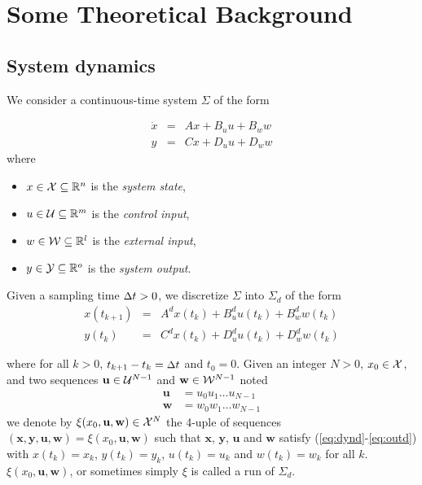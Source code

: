 \documentclass[hyperref, xcolor=dvipsnames, 10pt]{article} %
\def \x {\mathbf{x}}
\def \u {\mathbf{u}}
\def \w {\mathbf{w}}
\def \y {\mathbf{y}}
\def\dt{ \text{\small $\Delta$}t}
\def\X {{\cal X}}
\def\U {{\cal U}}
\def\W {{\cal W}}
\def\Y {{\cal Y}}
\def\Reals {\mathbb{R}}
\begin{document}
\section{Some Theoretical Background} 

\subsection{System dynamics}
We consider a continuous-time system $\Sigma$ of the form 

\begin{eqnarray}
\dot{x} &= &A x + B_u u + B_w w \\ 
 y &=& C x + D_u u + D_w w
\end{eqnarray}
where 
\begin{itemize}
\item $x \in {\cal X} \subseteq \Reals^{n}$ is the \emph{system state},
\item $u \in \U \subseteq \Reals^{m}$ is the \emph{control input},
\item $w \in \W \subseteq \Reals^{l}$ is the \emph{external input}, 
\item $y \in \Y \subseteq \Reals^{o}$ is the \emph{system output}.
\end{itemize}

Given a sampling time $\dt>0$, we discretize $\Sigma$ into 
$\Sigma_d$ of the form
\begin{eqnarray}
x(t_{k+1}) &= &A^d x(t_k) + B^d_u u(t_k) + B^d_w w(t_k)  \label{eq:dynd} \\ 
 y(t_k) &=& C^d x(t_k) + D^d_u u(t_k) + D^d_w w(t_k)  \label{eq:outd}
\end{eqnarray}

where for all $k>0$, $t_{k+1}-t_k = \dt$ and $t_0=0$. Given an integer $N>0$, $x_0\in\X$, and two sequences 
$\u \in \U^{N-1}$ and $\w \in \W^{N-1}$ noted
\begin{eqnarray*}
\u&= u_0u_1\hdots u_{N-1}\\
\w&= w_0w_1\hdots w_{N-1}
\end{eqnarray*}
we denote by $\xi(x_0, \u, \w) \in \X^N$ the 4-uple of sequences
$(\x,\y,\u,\w) = \xi(x_0, \u, \w)$ such that $\x$, $\y$, $\u$ and $\w$ satisfy (\ref{eq:dynd}-\ref{eq:outd}) with
$x(t_k)=x_k$, $y(t_k)=y_k$, $u(t_k)=u_k$ and $w(t_k)=w_k$ for all $k$. $\xi(x_0, \u, \w)$, or
sometimes simply $\xi$ is called a run of $\Sigma_d$.

\def\Dxi{\X\times\Y\times\U\times\W}
\end{document}
